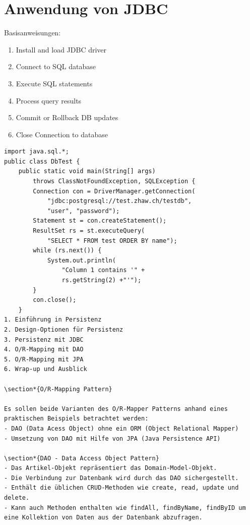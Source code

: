 \documentclass[10pt]{article}
\begin{document}
\section*{Anwendung von JDBC}
Basisanweisungen:

\begin{enumerate}
  \item Install and load JDBC driver
  \item Connect to SQL database
  \item Execute SQL statements
  \item Process query results
  \item Commit or Rollback DB updates
  \item Close Connection to database
\end{enumerate}

\begin{verbatim}
import java.sql.*;
public class DbTest {
    public static void main(String[] args)
        throws ClassNotFoundException, SQLException {
        Connection con = DriverManager.getConnection(
            "jdbc:postgresql://test.zhaw.ch/testdb",
            "user", "password");
        Statement st = con.createStatement();
        ResultSet rs = st.executeQuery(
            "SELECT * FROM test ORDER BY name");
        while (rs.next()) {
            System.out.println(
                "Column 1 contains '" +
                rs.getString(2) +"'");
        }
        con.close();
    }
1. Einführung in Persistenz
2. Design-Optionen für Persistenz
3. Persistenz mit JDBC
4. O/R-Mapping mit DAO
5. O/R-Mapping mit JPA
6. Wrap-up und Ausblick

\section*{O/R-Mapping Pattern}

Es sollen beide Varianten des O/R-Mapper Patterns anhand eines praktischen Beispiels betrachtet werden:
- DAO (Data Acess Object) ohne ein ORM (Object Relational Mapper)
- Umsetzung von DAO mit Hilfe von JPA (Java Persistence API)

\section*{DAO - Data Access Object Pattern}
- Das Artikel-Objekt repräsentiert das Domain-Model-Objekt.
- Die Verbindung zur Datenbank wird durch das DAO sichergestellt.
- Enthält die üblichen CRUD-Methoden wie create, read, update und delete.
- Kann auch Methoden enthalten wie findAll, findByName, findByID um eine Kollektion von Daten aus der Datenbank abzufragen.


\end{verbatim}
\end{document}

